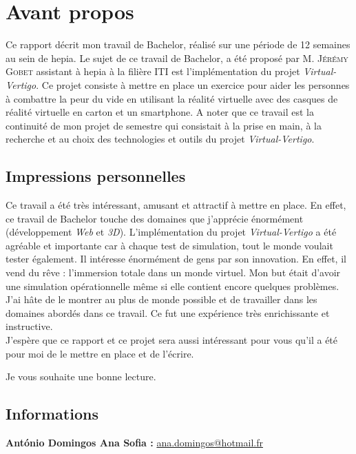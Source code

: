 \section*{Avant propos}

Ce rapport décrit mon travail de Bachelor, réalisé sur une période de 12 semaines au sein de hepia. Le sujet de ce travail de Bachelor, a été proposé par \textsc{M. Jérémy Gobet} assistant à hepia à la filière ITI est l'implémentation du projet \textit{Virtual-Vertigo}. Ce projet consiste à mettre en place un exercice pour aider les personnes à combattre la peur du vide en utilisant la réalité virtuelle avec des casques de réalité virtuelle en carton et un smartphone. A noter que ce travail est la continuité de mon projet de semestre qui consistait à la prise en main, à la recherche et au choix des technologies et outils du projet \textit{Virtual-Vertigo}. 

\subsection*{Impressions personnelles}
Ce travail a été très intéressant, amusant et attractif à mettre en place. En effet, ce travail de Bachelor touche des domaines que j'apprécie énormément (développement \textit{Web} et \textit{3D}). L'implémentation du projet \textit{Virtual-Vertigo} a été agréable et importante car à chaque test de simulation, tout le monde voulait tester également. Il intéresse énormément de gens par son innovation. En effet, il vend du rêve : l'immersion totale dans un monde virtuel. Mon but était d'avoir une simulation opérationnelle même si elle contient encore quelques problèmes. J'ai hâte de le montrer au plus de monde possible et de travailler dans les domaines abordés dans ce travail. Ce fut une expérience très enrichissante et instructive. \\

J'espère que ce rapport et ce projet sera aussi intéressant pour vous qu'il a été pour moi de le mettre en place et de l'écrire.
\begin{center} Je vous souhaite une bonne lecture. \end{center} 
\subsection*{Informations}


\textbf{António Domingos Ana Sofia :} \href{ana.domingos@hotmail.fr}{ana.domingos@hotmail.fr}

